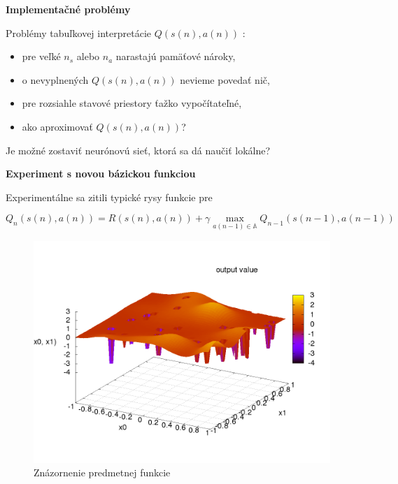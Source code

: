 \documentclass[xcolor=dvipsnames]{beamer}
\begin{document}
\begin{frame}{\bf Implementačné problémy}

Problémy tabuľkovej interpretácie $Q(s(n), a(n))$ :

\begin{itemize}
\item pre veľké ${n_s}$  alebo  ${n_a}$ narastajú pamäťové nároky,
\item o nevyplnených $Q(s(n), a(n))$ nevieme povedať nič,
\item pre rozsiahle stavové priestory ťažko vypočítateľné,
\item ako aproximovať $Q(s(n), a(n))$?
\end{itemize}

Je možné zostaviť neurónovú sieť, ktorá sa dá naučiť lokálne?

\end{frame}


\begin{frame}{\bf Experiment s novou bázickou funkciou}

Experimentálne sa zitili typické rysy funkcie pre

\begin{equation*}
Q_{n}(s(n),a(n)) = R(s(n),a(n)) + \gamma \max_{a(n-1) \in \mathbb{A}} Q_{n-1}(s(n-1), a(n-1))
\label{eq:q_learning}
\end{equation*}

\begin{figure}[]
\center
\includegraphics[scale=.35]{../pictures/peak_hill_function.png}
\caption{Znázornenie predmetnej funkcie}
\label{img:peak_hill_funcion}
\end{figure}

\end{frame}
\end{document}

